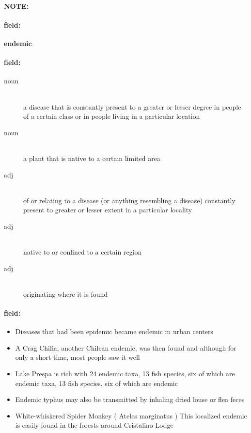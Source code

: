 \documentclass[12pt]{article}
\newenvironment{note}{\paragraph{NOTE:}}{}
\newenvironment{field}{\paragraph{field:}}{}
\begin{document}
\begin{note}
\begin{field}
\textbf{\large endemic}
\end{field}


\begin{field}
\begin{description}
\item[noun] \hfill \\ 
a disease that is constantly present to a greater or lesser degree in people of a certain class or in people living in a particular location

\item[noun] \hfill \\ 
a plant that is native to a certain limited area

\item[adj] \hfill \\ 
of or relating to a disease (or anything resembling a disease) constantly present to greater or lesser extent in a particular locality

\item[adj] \hfill \\ 
native to or confined to a certain region

\item[adj] \hfill \\ 
originating where it is found

\end{description}
\end{field}

\begin{field}
\begin{itemize}
\item Diseases that had been epidemic became endemic in urban centers
\item A Crag Chilia, another Chilean endemic, was then found and although for only a short time, most people saw it well
\item Lake Prespa is rich with 24 endemic taxa, 13 fish species, six of which are endemic taxa, 13 fish species, six of which are endemic
\item Endemic typhus may also be transmitted by inhaling dried louse or flea feces
\item White-whiskered Spider Monkey ( Ateles marginatus ) This localized endemic is easily found in the forests around Cristalino Lodge
\end{itemize}
\end{field}
\end{note}
\end{document}
